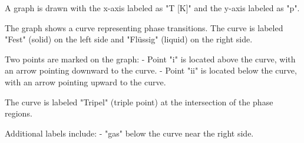 A graph is drawn with the x-axis labeled as "T [K]" and the y-axis labeled as "p".  

The graph shows a curve representing phase transitions. The curve is labeled "Fest" (solid) on the left side and "Flüssig" (liquid) on the right side.  

Two points are marked on the graph:  
- Point "i" is located above the curve, with an arrow pointing downward to the curve.  
- Point "ii" is located below the curve, with an arrow pointing upward to the curve.  

The curve is labeled "Tripel" (triple point) at the intersection of the phase regions.  

Additional labels include:  
- "gas" below the curve near the right side.